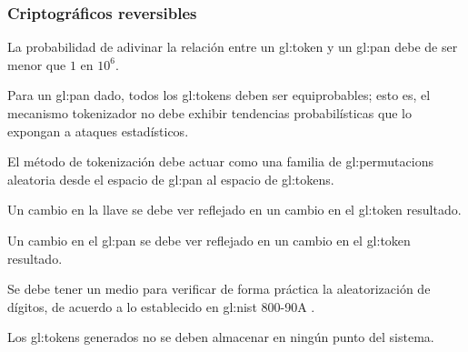 %
%

\subsubsection{Criptográficos reversibles}

{
  La probabilidad de adivinar la relación entre un \gls{gl:token} y un
  \gls{gl:pan} debe de ser menor que $ 1 $ en $ 10^6 $.

  {
    Para un \gls{gl:pan} dado, todos los \glspl{gl:token} deben ser
    equiprobables; esto es, el mecanismo tokenizador no debe exhibir
    tendencias probabilísticas que lo expongan a ataques estadísticos.
  }

  {
    El método de tokenización debe actuar como una familia de
    \glspl{gl:permutacion} aleatoria desde el espacio de \gls{gl:pan} al
    espacio de \glspl{gl:token}.
  }

  {
    Un cambio en la llave se debe ver reflejado en un cambio en el
    \gls{gl:token} resultado.
  }

  {
    Un cambio en el \gls{gl:pan} se debe ver reflejado en un cambio en el
    \gls{gl:token} resultado.
  }

  {
    Se debe tener un medio para verificar de forma práctica la aleatorización
    de dígitos, de acuerdo a lo establecido en \gls{gl:nist} 800-90A
    \cite{nist_aleatorios}.
  }

}

{
  Los \glspl{gl:token} generados no se deben almacenar en ningún punto del
  sistema.
}

